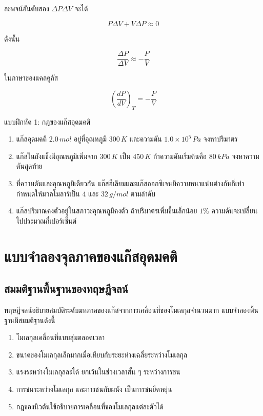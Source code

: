 ละพจน์อันดับสอง $\Delta P\Delta V$ จะได้

\[
P\Delta V+V\Delta P\approx0
\]

ดังนั้น

\[
\boxed{
\frac{\Delta P}{\Delta V}
\approx
-\frac{P}{V}
}
\]

ในภาษาของแคลคูลัส

\[
\boxed{
\left(\frac{dP}{dV}\right)_T
=
-\frac{P}{V}
}
\]

\begin{exercisebox}{แบบฝึกหัด 1: กฎของแก๊สอุดมคติ}
\begin{enumerate}
    \item แก๊สอุดมคติ $2.0\,\si{mol}$ อยู่ที่อุณหภูมิ $300\,\si{K}$ และความดัน $1.0\times10^5\,\si{Pa}$ จงหาปริมาตร
    \item แก๊สในถังแข็งมีอุณหภูมิเพิ่มจาก $300\,\si{K}$ เป็น $450\,\si{K}$ ถ้าความดันเริ่มต้นคือ $80\,\si{kPa}$ จงหาความดันสุดท้าย
    \item ที่ความดันและอุณหภูมิเดียวกัน แก๊สฮีเลียมและแก๊สออกซิเจนมีความหนาแน่นต่างกันกี่เท่า กำหนดให้มวลโมลาร์เป็น $4$ และ $32\,\si{g/mol}$ ตามลำดับ
    \item แก๊สปริมาณคงตัวอยู่ในสภาวะอุณหภูมิคงตัว ถ้าปริมาตรเพิ่มขึ้นเล็กน้อย $1\%$ ความดันจะเปลี่ยนไปประมาณกี่เปอร์เซ็นต์
\end{enumerate}
\end{exercisebox}

\section{แบบจำลองจุลภาคของแก๊สอุดมคติ}

\subsection{สมมติฐานพื้นฐานของทฤษฎีจลน์}

ทฤษฎีจลน์อธิบายสมบัติระดับมหภาคของแก๊สจากการเคลื่อนที่ของโมเลกุลจำนวนมาก แบบจำลองพื้นฐานมีสมมติฐานดังนี้

\begin{enumerate}
    \item โมเลกุลเคลื่อนที่แบบสุ่มตลอดเวลา
    \item ขนาดของโมเลกุลเล็กมากเมื่อเทียบกับระยะห่างเฉลี่ยระหว่างโมเลกุล
    \item แรงระหว่างโมเลกุลละได้ ยกเว้นในช่วงเวลาสั้น ๆ ระหว่างการชน
    \item การชนระหว่างโมเลกุล และการชนกับผนัง เป็นการชนยืดหยุ่น
    \item กฎของนิวตันใช้อธิบายการเคลื่อนที่ของโมเลกุลแต่ละตัวได้
\end{enumerate}

